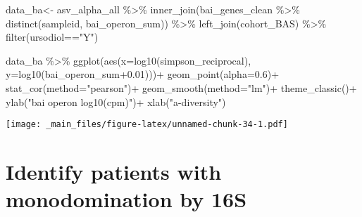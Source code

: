 \documentclass[
]{book}
\newenvironment{Shaded}{\begin{snugshade}}{\end{snugshade}}
\newcommand{\AttributeTok}[1]{\textcolor[rgb]{0.77,0.63,0.00}{#1}}
\newcommand{\FloatTok}[1]{\textcolor[rgb]{0.00,0.00,0.81}{#1}}
\newcommand{\FunctionTok}[1]{\textcolor[rgb]{0.00,0.00,0.00}{#1}}
\newcommand{\NormalTok}[1]{#1}
\newcommand{\OtherTok}[1]{\textcolor[rgb]{0.56,0.35,0.01}{#1}}
\newcommand{\SpecialCharTok}[1]{\textcolor[rgb]{0.00,0.00,0.00}{#1}}
\newcommand{\StringTok}[1]{\textcolor[rgb]{0.31,0.60,0.02}{#1}}
\begin{document}
\begin{Shaded}
\begin{Highlighting}[]
\NormalTok{data\_ba}\OtherTok{\textless{}{-}}\NormalTok{ asv\_alpha\_all }\SpecialCharTok{\%\textgreater{}\%}  
  \FunctionTok{inner\_join}\NormalTok{(bai\_genes\_clean }\SpecialCharTok{\%\textgreater{}\%} \FunctionTok{distinct}\NormalTok{(sampleid, bai\_operon\_sum)) }\SpecialCharTok{\%\textgreater{}\%} 
  \FunctionTok{left\_join}\NormalTok{(cohort\_BAS) }\SpecialCharTok{\%\textgreater{}\%} 
  \FunctionTok{filter}\NormalTok{(ursodiol}\SpecialCharTok{==}\StringTok{"Y"}\NormalTok{)}

\NormalTok{data\_ba }\SpecialCharTok{\%\textgreater{}\%} 
\FunctionTok{ggplot}\NormalTok{(}\FunctionTok{aes}\NormalTok{(}\AttributeTok{x=}\FunctionTok{log10}\NormalTok{(simpson\_reciprocal), }\AttributeTok{y=}\FunctionTok{log10}\NormalTok{(bai\_operon\_sum}\FloatTok{+0.01}\NormalTok{)))}\SpecialCharTok{+}
  \FunctionTok{geom\_point}\NormalTok{(}\AttributeTok{alpha=}\FloatTok{0.6}\NormalTok{)}\SpecialCharTok{+}
  \FunctionTok{stat\_cor}\NormalTok{(}\AttributeTok{method=}\StringTok{"pearson"}\NormalTok{)}\SpecialCharTok{+}
  \FunctionTok{geom\_smooth}\NormalTok{(}\AttributeTok{method=}\StringTok{"lm"}\NormalTok{)}\SpecialCharTok{+}
  \FunctionTok{theme\_classic}\NormalTok{()}\SpecialCharTok{+}
  \FunctionTok{ylab}\NormalTok{(}\StringTok{"bai operon log10(cpm)"}\NormalTok{)}\SpecialCharTok{+}
  \FunctionTok{xlab}\NormalTok{(}\StringTok{"a{-}diversity"}\NormalTok{)}
\end{Highlighting}
\end{Shaded}

\texttt{[image: \_main\_files/figure-latex/unnamed-chunk-34-1.pdf]}

\hypertarget{identify-patients-with-monodomination-by-16s}{%
\section{Identify patients with monodomination by 16S}\label{identify-patients-with-monodomination-by-16s}}
\end{document}
